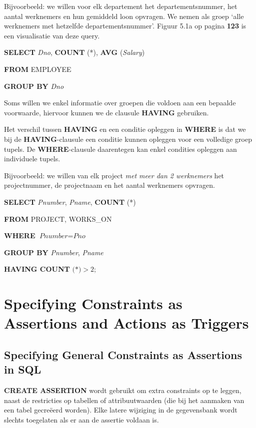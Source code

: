 Bijvoorbeeld: we willen voor elk departement het departementsnummer, het aantal werknemers en hun gemiddeld loon opvragen. We nemen als groep `alle werknemers met hetzelfde departementsnummer'. Figuur 5.1a op pagina \textbf{123} is een visualisatie van deze query.

\vspace{1mm}\hspace{10mm}
\textbf{SELECT} \textit{Dno}, \textbf{COUNT} (*), \textbf{AVG} (\textit{Salary})

\hspace{10mm}
\textbf{FROM} EMPLOYEE

\hspace{10mm}
\textbf{GROUP BY} \textit{Dno}
\vspace{3mm}

\noindent Soms willen we enkel informatie over groepen die voldoen aan een bepaalde voorwaarde, hiervoor kunnen we de clausule \textbf{HAVING} gebruiken.

Het verschil tussen \textbf{HAVING} en een conditie opleggen in \textbf{WHERE} is dat we bij de \textbf{HAVING}-clausule een conditie kunnen opleggen voor een volledige groep tupels. De \textbf{WHERE}-clausule daarentegen kan enkel condities opleggen aan individuele tupels.

Bijvoorbeeld: we willen van elk project \textit{met meer dan 2 werknemers} het projectnummer, de projectnaam en het aantal werknemers opvragen.

\vspace{1mm}\hspace{10mm}
\textbf{SELECT} \textit{Pnumber}, \textit{Pname}, \textbf{COUNT} (*)

\hspace{10mm}
\textbf{FROM} PROJECT, WORKS\_ON

\hspace{10mm}
\textbf{WHERE} $\textit{Pnumber} = \textit{Pno}$

\hspace{10mm}
\textbf{GROUP BY} \textit{Pnumber}, \textit{Pname}

\hspace{10mm}
\textbf{HAVING COUNT} $\text{(*)} > 2$;



\section{Specifying Constraints as Assertions and Actions as Triggers}
\subsection{Specifying General Constraints as Assertions in SQL}
\textbf{CREATE ASSERTION} wordt gebruikt om extra constraints op te leggen, naast de restricties op tabellen of attribuutwaarden (die bij het aanmaken van een tabel gecre\"eerd worden). Elke latere wijziging in de gegevensbank wordt slechts toegelaten als er aan de assertie voldaan is.


